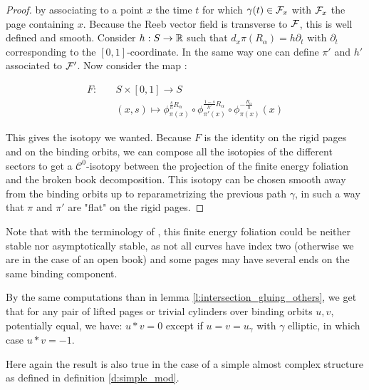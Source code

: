\documentclass[../main.tex]{subfiles}
\begin{document}
\begin{proof}
\noindent by associating to a point $x$ the time $t$ for which $\gamma(t) \in \mathcal{F}_x$ with $\mathcal{F}_x$ the page containing $x$. Because the Reeb vector field is transverse to $\mathcal{F}$, this is well defined and smooth. Consider $h : S \rightarrow \mathbb{R}$ such that $d_x\pi(R_\alpha) = h\partial_t$ with $\partial_t$ corresponding to the $[0,1]$-coordinate. In the same way one can define $\pi'$ and $h'$ associated to $\mathcal{F} '$. Now consider the map :  

\begin{align*}
    F : \quad  &S\times [0,1]\longrightarrow S\\
    &(x,s) \longmapsto\phi_{\pi(x)}^{\frac{s}{h}R_\alpha  }\circ\phi^{\frac{1-s}{h'}R_\alpha}_{\pi'(x)}\circ\phi_{\pi(x)}^{-\frac{R_\alpha}{h}}(x)
\end{align*}

This gives the isotopy we wanted. Because $F$ is the identity on the rigid pages and on the binding orbits, we can compose all the isotopies of the different sectors to get a $\mathcal{C}^0$-isotopy between the projection of the finite energy foliation and the broken book decomposition. This isotopy can be chosen smooth away from the binding orbits up to reparametrizing the previous path $\gamma$, in such a way that $\pi$ and $\pi'$ are "flat" on the rigid pages. 
\end{proof}

\begin{remark}
Note that with the terminology of \cite{wendl_strongly_2010}, this finite energy foliation could be neither stable nor asymptotically stable, as  not all curves have index two (otherwise we are in the case of an open book) and some pages may have several ends on the same binding component.
\end{remark}

\begin{remark}
By the same computations than in lemma \ref{l:intersection_gluing_others}, we get that for any pair of lifted pages or trivial cylinders over binding orbits $u,v$, potentially equal, we have: $u*v = 0$ except if $u = v = u_\gamma$ with $\gamma$ elliptic, in which case $u*v = -1$.
\end{remark}

\begin{remark}
Here again the result is also true in the case of a simple almost complex structure as defined in definition \ref{d:simple_mod}.
\end{remark}
\end{document}
